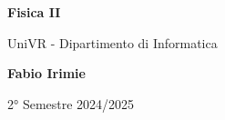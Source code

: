 \begin{titlepage}
	\begin{center}
		\vspace*{1cm}

		\Huge
		\textbf{Fisica II}

		\vspace{0.5cm}
		\LARGE
		UniVR - Dipartimento di Informatica

		\vspace{1.5cm}

		\textbf{Fabio Irimie}

		\vfill


		\vspace{0.8cm}


		2° Semestre 2024/2025

	\end{center}
\end{titlepage}
